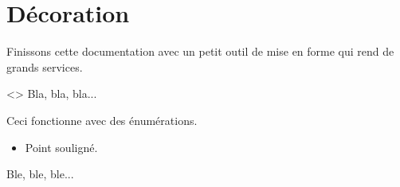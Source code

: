 \documentclass{../main/main}
\begin{document}
\section{Décoration}

Finissons cette documentation avec un petit outil de mise en forme qui rend de grands services.


\begin{tdoclatex}<>
Bla, bla, bla...

\tdocsep %

Ceci fonctionne avec des énumérations.

\begin{itemize}
    \item Point souligné.
\end{itemize}

\tdocsep %

Ble, ble, ble...
\end{tdoclatex}
\end{document}
